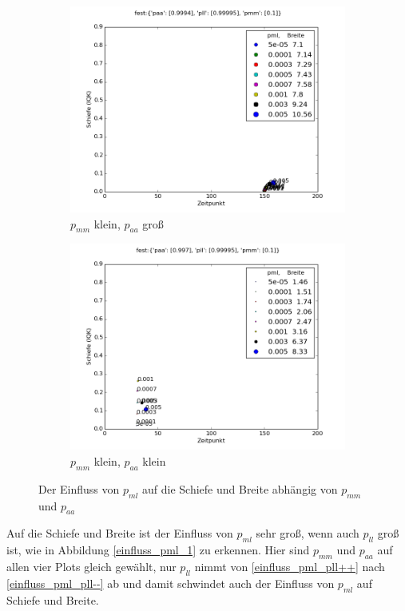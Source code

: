 \begin{figure}
\begin{subfigure}[b]{0.49\textwidth}
\includegraphics[width=\textwidth]{bilder/pml/pml_01_p_09994_099995}
\caption{$p_{mm}$ klein, $p_{aa}$ groß}
\end{subfigure}
\begin{subfigure}[b]{0.49\textwidth}
\includegraphics[width=\textwidth]{bilder/pml/pml_01_p_0997_099995}
\caption{$p_{mm}$ klein, $p_{aa}$ klein}
\end{subfigure}
\caption{Der Einfluss von $p_{ml}$ auf die Schiefe und Breite abhängig von $p_{mm}$ und $p_{aa}$}
\label{einfluss_pml_2}
\end{figure}

Auf die Schiefe und Breite ist der Einfluss von $p_{ml}$ sehr groß, wenn auch $p_{ll}$ groß ist, wie in Abbildung \ref{einfluss_pml_1} zu erkennen. Hier sind $p_{mm}$ und $p_{aa}$ auf allen vier Plots gleich gewählt, nur $p_{ll}$ nimmt von \ref{einfluss_pml_pll++} nach \ref{einfluss_pml_pll--} ab und damit schwindet auch der Einfluss von $p_{ml}$ auf Schiefe und Breite.

